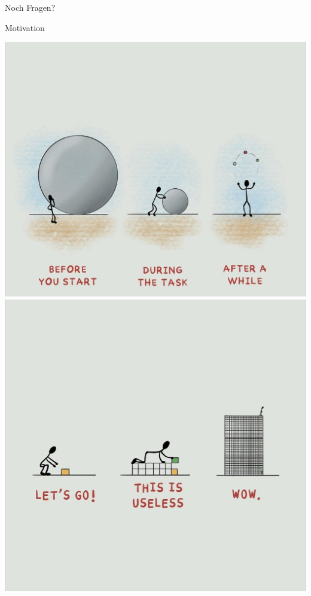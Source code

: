 \documentclass[
  8pt,
  ignorenonframetext,
]{beamer}
\begin{document}
\begin{frame}[plain]{}
\protect\hypertarget{section-4}{}
\huge
\center
\vfill

Noch Fragen? \vfill
\end{frame}

\begin{frame}{Motivation}
\protect\hypertarget{motivation}{}
\begin{center}\includegraphics[width=0.45\linewidth]{../Abbildungen/mot_2} \includegraphics[width=0.45\linewidth]{../Abbildungen/mot_1} \end{center}
\end{frame}
\end{document}
